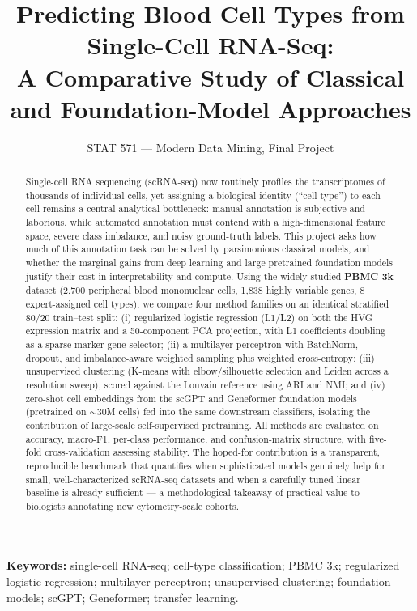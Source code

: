 \documentclass[11pt]{article}
\title{Predicting Blood Cell Types from Single-Cell RNA-Seq:\\
A Comparative Study of Classical and Foundation-Model Approaches}
\author{STAT 571 --- Modern Data Mining, Final Project}
\date{}
\begin{document}
\maketitle

\noindent\textbf{Keywords:} single-cell RNA-seq; cell-type classification; PBMC 3k; regularized logistic regression; multilayer perceptron; unsupervised clustering; foundation models; scGPT; Geneformer; transfer learning.

\begin{abstract}
Single-cell RNA sequencing (scRNA-seq) now routinely profiles the transcriptomes of thousands of individual cells, yet assigning a biological identity (``cell type'') to each cell remains a central analytical bottleneck: manual annotation is subjective and laborious, while automated annotation must contend with a high-dimensional feature space, severe class imbalance, and noisy ground-truth labels. This project asks how much of this annotation task can be solved by parsimonious classical models, and whether the marginal gains from deep learning and large pretrained foundation models justify their cost in interpretability and compute. Using the widely studied \textbf{PBMC 3k} dataset (2{,}700 peripheral blood mononuclear cells, 1{,}838 highly variable genes, 8 expert-assigned cell types), we compare four method families on an identical stratified 80/20 train--test split: (i) regularized logistic regression (L1/L2) on both the HVG expression matrix and a 50-component PCA projection, with L1 coefficients doubling as a sparse marker-gene selector; (ii) a multilayer perceptron with BatchNorm, dropout, and imbalance-aware weighted sampling plus weighted cross-entropy; (iii) unsupervised clustering (K-means with elbow/silhouette selection and Leiden across a resolution sweep), scored against the Louvain reference using ARI and NMI; and (iv) zero-shot cell embeddings from the scGPT and Geneformer foundation models (pretrained on $\sim$30M cells) fed into the same downstream classifiers, isolating the contribution of large-scale self-supervised pretraining. All methods are evaluated on accuracy, macro-F1, per-class performance, and confusion-matrix structure, with five-fold cross-validation assessing stability. The hoped-for contribution is a transparent, reproducible benchmark that quantifies when sophisticated models genuinely help for small, well-characterized scRNA-seq datasets and when a carefully tuned linear baseline is already sufficient --- a methodological takeaway of practical value to biologists annotating new cytometry-scale cohorts.
\end{abstract}
\end{document}
